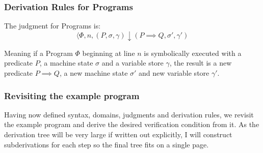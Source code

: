 \subsubsection*{Derivation Rules for Programs}

The judgment for Programs is:
\[
\langle \Phi, n, (P, \sigma, \gamma) \downarrow (P \implies Q, \sigma', \gamma')
\]

Meaning if a Program $\Phi$ beginning at line $n$ is symbolically executed with a predicate $P$, a machine state $\sigma$ and a variable store $\gamma$, the result is a new predicate $P \implies Q$, a new machine state $\sigma'$ and new variable store $\gamma'$.



\begin{prooftree}
\end{prooftree}

\begin{prooftree}
\end{prooftree}

\begin{prooftree}
\end{prooftree}





\subsubsection*{Revisiting the example program}
Having now defined syntax, domains, judgments and derivation rules, we revisit the example program and derive the desired verification condition from it.
As the derivation tree will be very large if written out explicitly, I will construct subderivations for each step so the final tree fits on a single page. 


